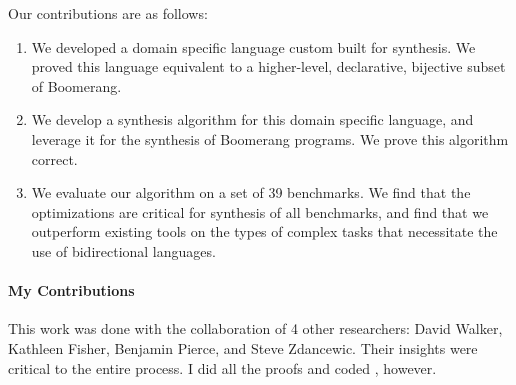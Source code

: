 \documentclass[a4paper,twoside]{article}
\begin{document}
Our contributions are as follows:
\begin{enumerate}
\item We developed a domain specific language custom built for synthesis.  We
  proved this language equivalent to a higher-level, declarative, bijective
  subset of Boomerang.

\item We develop a synthesis algorithm for this domain specific language, and
  leverage it for the synthesis of Boomerang programs.  We prove this algorithm
  correct.

\item We evaluate our algorithm on a set of 39 benchmarks.  We find that the
  optimizations are critical for synthesis of all benchmarks, and find that we
  outperform existing tools on the types of complex tasks that necessitate the
  use of bidirectional languages.
\end{enumerate}

\paragraph*{My Contributions}
This work was done with the collaboration of 4 other researchers: David Walker,
Kathleen Fisher, Benjamin Pierce, and Steve Zdancewic.  Their insights
were critical to the entire process.  I did all the proofs and coded
\Optician{}, however.

%
%




\end{document}

